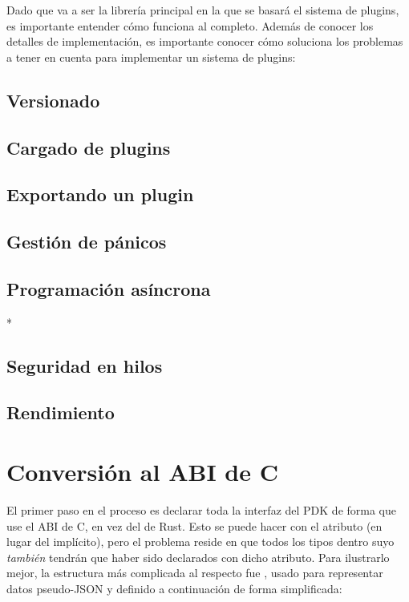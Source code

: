 Dado que \abistable va a ser la librería principal en la que se basará el
sistema de plugins, es importante entender cómo funciona al completo. Además de
conocer los detalles de implementación, es importante conocer cómo \abistable
soluciona los problemas a tener en cuenta para implementar un sistema de
plugins:

\subsection{Versionado}

\subsection{Cargado de plugins}

\subsection{Exportando un plugin}

\subsection{Gestión de pánicos}

\subsection{Programación asíncrona}

* 

\subsection{Seguridad en hilos}

\subsection{Rendimiento}\label{abiperf}

\section{Conversión al ABI de C}

El primer paso en el proceso es declarar toda la interfaz del PDK de forma que
use el ABI de C, en vez del de Rust. Esto se puede hacer con el atributo
\code{#[repr(C)]} (en lugar del  implícito), pero el
problema reside en que todos los tipos dentro suyo \emph{también} tendrán que
haber sido declarados con dicho atributo. Para ilustrarlo mejor, la estructura
más complicada al respecto fue , usado para representar datos
pseudo-JSON y definido a continuación de forma simplificada:

